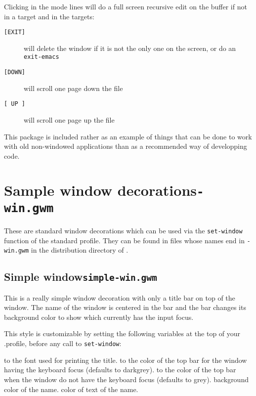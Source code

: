 Clicking in the mode lines will do a full screen recursive edit on the
buffer if not in a target and in the targets:

\begin{description}
\item[{\tt [EXIT]}] will delete the window if it is not the only one on
the screen, or do an {\tt exit-emacs}
\item[{\tt [DOWN]}] will scroll one page down the file
\item[{\tt [ UP ]}] will scroll one page up the file
\end{description}

This package is included rather as an example of things that can be done
to work with old non-windowed applications than as a recommended way of
developping code.

\section{Sample window decorations\hfill{\tt *-win.gwm}}
\label{standard-decorations}

These are standard window decorations which can be used via the
\verb"set-window" function of the standard profile. They can be found in
files whose names end in {\tt -win.gwm} in the distribution directory of
{\GWM}.

\subsection{Simple window\hfill{\tt simple-win.gwm}}
\label{simple-win}

\centerline{}

This is a really simple window decoration with only a title bar on top of
the window. The name of the window is centered in the bar and the bar
changes its background color to show which currently has the input focus.

This style is customizable by setting the following variables at the top
of your .profile, before any call to \verb"set-window":

\begin{description}
 to the font used for printing the title.
 to the color of the top bar for the window having
the keyboard focus (defaults to darkgrey).
 to the color of the top bar when the window
do not have the keyboard focus (defaults to grey).
 background color of the name.
 color of text of the name.
\end{description}

